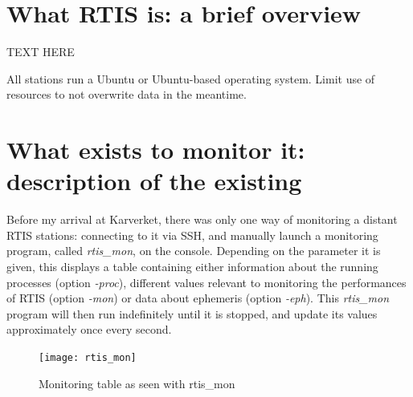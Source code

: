 \documentclass{themeensg}
\begin{document}

\section{What RTIS is: a brief overview}

TEXT HERE

All stations run a Ubuntu or Ubuntu-based operating system. Limit use of resources to not overwrite data in the meantime.


\section{What exists to monitor it: description of the existing}

Before my arrival at Karverket, there was only one way of monitoring a distant RTIS stations: connecting to it via SSH, and manually launch a monitoring program, called \textit{rtis\_mon}, on the console. Depending on the parameter it is given, this displays a table containing either information about the running processes (option \textit{-proc}), different values relevant to monitoring the performances of RTIS (option \textit{-mon}) or data about ephemeris (option \textit{-eph}). This \textit{rtis\_mon} program will then run indefinitely until it is stopped, and update its values approximately once every second.

\begin{figure}[!ht]
	\centering
	\texttt{[image: rtis\_mon]}
	\caption{Monitoring table as seen with rtis\_mon}
\end{figure}
\end{document}
